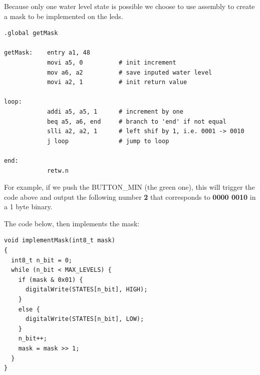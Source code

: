 \documentclass[11pt]{article}
\begin{document}
Because only one water level state is possible we choose to use assembly to create a mask to be implemented on the leds.

\begin{verbatim}
.global getMask

getMask:    entry a1, 48
            movi a5, 0          # init increment
            mov a6, a2          # save inputed water level
            movi a2, 1          # init return value

loop: 
            addi a5, a5, 1      # increment by one
            beq a5, a6, end     # branch to 'end' if not equal
            slli a2, a2, 1      # left shif by 1, i.e. 0001 -> 0010
            j loop              # jump to loop 

end:
            retw.n
\end{verbatim}

For example, if we push the BUTTON\_MIN (the green one), this will trigger the code above and output the following number \textbf{2} that corresponds to \textbf{0000 0010} in a 1 byte binary. 

The code below, then implements the mask:

\begin{verbatim}
void implementMask(int8_t mask)
{
  int8_t n_bit = 0;
  while (n_bit < MAX_LEVELS) {
    if (mask & 0x01) {
      digitalWrite(STATES[n_bit], HIGH);
    }
    else {
      digitalWrite(STATES[n_bit], LOW);
    }
    n_bit++;
    mask = mask >> 1;
  }
}
\end{verbatim}
\end{document}
